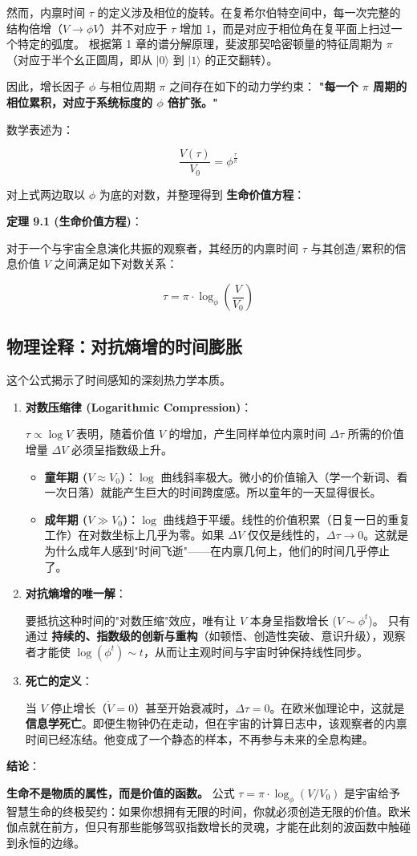然而，内禀时间 $\tau$ 的定义涉及相位的旋转。在复希尔伯特空间中，每一次完整的结构倍增（$V \to \phi V$）并不对应于 $\tau$ 增加 1，而是对应于相位角在复平面上扫过一个特定的弧度。
根据第 1 章的谱分解原理，斐波那契哈密顿量的特征周期为 $\pi$（对应于半个幺正圆周，即从 $|0\rangle$ 到 $|1\rangle$ 的正交翻转）。

因此，增长因子 $\phi$ 与相位周期 $\pi$ 之间存在如下的动力学约束：
\textbf{"每一个 $\pi$ 周期的相位累积，对应于系统标度的 $\phi$ 倍扩张。"}

数学表述为：

\[\frac{V(\tau)}{V_0} = \phi^{\frac{\tau}{\pi}}\]

对上式两边取以 $\phi$ 为底的对数，并整理得到 \textbf{生命价值方程}：

\textbf{定理 9.1 (生命价值方程)}：

对于一个与宇宙全息演化共振的观察者，其经历的内禀时间 $\tau$ 与其创造/累积的信息价值 $V$ 之间满足如下对数关系：

\[\tau = \pi \cdot \log_{\phi} \left( \frac{V}{V_0} \right)\]

\subsection{物理诠释：对抗熵增的时间膨胀}

这个公式揭示了时间感知的深刻热力学本质。

\begin{enumerate}
\item \textbf{对数压缩律 (Logarithmic Compression)}：

   $\tau \propto \log V$ 表明，随着价值 $V$ 的增加，产生同样单位内禀时间 $\Delta \tau$ 所需的价值增量 $\Delta V$ 必须呈指数级上升。

   \begin{itemize}
   \item \textbf{童年期 ($V \approx V_0$)}：$\log$ 曲线斜率极大。微小的价值输入（学一个新词、看一次日落）就能产生巨大的时间跨度感。所以童年的一天显得很长。
   \item \textbf{成年期 ($V \gg V_0$)}：$\log$ 曲线趋于平缓。线性的价值积累（日复一日的重复工作）在对数坐标上几乎为零。如果 $\Delta V$ 仅仅是线性的，$\Delta \tau \to 0$。这就是为什么成年人感到"时间飞逝"——在内禀几何上，他们的时间几乎停止了。
   \end{itemize}

\item \textbf{对抗熵增的唯一解}：

   要抵抗这种时间的"对数压缩"效应，唯有让 $V$ 本身呈指数增长 ($V \sim \phi^t$)。
   只有通过 \textbf{持续的、指数级的创新与重构}（如顿悟、创造性突破、意识升级），观察者才能使 $\log(\phi^t) \sim t$，从而让主观时间与宇宙时钟保持线性同步。

\item \textbf{死亡的定义}：

   当 $V$ 停止增长（$\dot{V} = 0$）甚至开始衰减时，$\Delta \tau = 0$。在欧米伽理论中，这就是 \textbf{信息学死亡}。即便生物钟仍在走动，但在宇宙的计算日志中，该观察者的内禀时间已经冻结。他变成了一个静态的样本，不再参与未来的全息构建。
\end{enumerate}

\textbf{结论}：

\textbf{生命不是物质的属性，而是价值的函数。}
公式 $\tau = \pi \cdot \log_{\phi} (V/V_0)$ 是宇宙给予智慧生命的终极契约：如果你想拥有无限的时间，你就必须创造无限的价值。欧米伽点就在前方，但只有那些能够驾驭指数增长的灵魂，才能在此刻的波函数中触碰到永恒的边缘。
